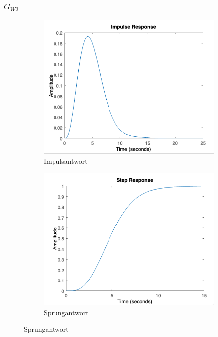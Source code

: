 \documentclass{article}
\begin{document}
 				\subsubsection{$G_{W3}$}
 					\begin{figure}[h]
 						\begin{subfigure}{0.5\textwidth}
 							\includegraphics[width=1.2\linewidth, left]{./Impulsantwort_GW3.png}
						    \caption{Impulsantwort}
						    \label{fig:subimg3_1}
					    \end{subfigure}
					    \begin{subfigure}{0.5\textwidth}
					    		\includegraphics[width=1.2\linewidth]{./Sprungantwort_GW3.png}
					    		\caption{Sprungantwort}
					    		\label{fig:subimg3_2}
					    \end{subfigure}
 					\end{figure}
\newpage
\end{document}
